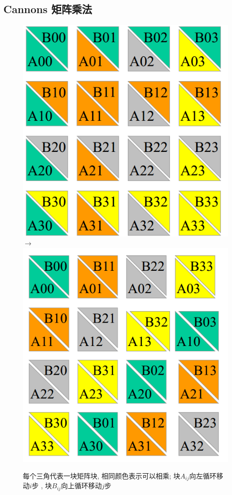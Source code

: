 \documentclass[UTF8,a4paper]{ctexart}
\begin{document}
\subsection{Cannons 矩阵乘法}
\begin{figure}[H]
  \centering
  \includegraphics[scale = 0.3]{assets/ParallelComputing_2c3d9.png}
  $\to$
  \includegraphics[scale = 0.3]{assets/ParallelComputing_84070.png}
  \caption{每个三角代表一块矩阵块, 相同颜色表示可以相乘; 块$A_{ij}$向左循环移动$i$步 , 块$B_{ij}$向上循环移动$j$步}
\end{figure}
\end{document}
